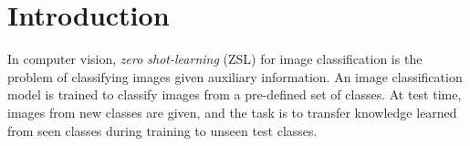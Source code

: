 \documentclass[11pt,a4paper]{article}
\newcommand\gal[1]{\textcolor{bright}{\textbf{GAL:} #1 }}
\begin{document}
\begin{abstract}
\end{abstract}





\section{Introduction}

In computer vision, {\em zero shot-learning} (ZSL) for image classification is the problem of classifying images given auxiliary information. An image classification model is trained to classify images from a pre-defined set of classes. At test time, images from new classes are given, and the task is to transfer knowledge learned from seen classes during training to unseen test classes. 
\end{document}
